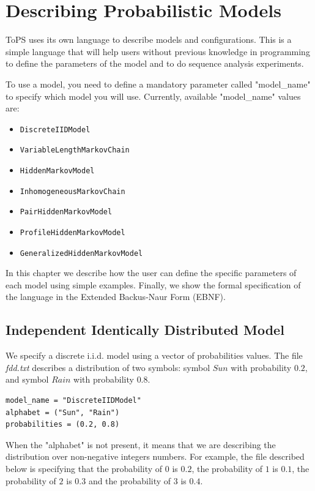 \chapter{Describing Probabilistic Models}


ToPS uses its own language to describe models and configurations. This is a simple language that will help users without previous knowledge in programming to define the parameters of the model and to do sequence analysis experiments.  

To use a model, you need to define a mandatory parameter called "model\_name" to specify which model you will use. Currently, available "model\_name"  values are:

\begin{itemize}
\item \texttt{DiscreteIIDModel} 
\item \texttt{VariableLengthMarkovChain} 
\item \texttt{HiddenMarkovModel}
\item \texttt{InhomogeneousMarkovChain}
\item \texttt{PairHiddenMarkovModel}
\item \texttt{ProfileHiddenMarkovModel} 
\item \texttt{GeneralizedHiddenMarkovModel}
\end{itemize}

In this chapter we describe how the user can define the specific parameters of each model using simple examples. Finally, we show the formal specification of the language in the Extended Backus-Naur Form (EBNF). 


\section{Independent Identically Distributed Model}

We specify a discrete i.i.d. model using a vector of probabilities values. The file \textit{fdd.txt} describes a distribution of two symbols: symbol $Sun$ with probability $0.2$, and symbol $Rain$ with probability $0.8$.

\begin{Verbatim}[frame=single,label=fdd.txt]
model_name = "DiscreteIIDModel"
alphabet = ("Sun", "Rain")
probabilities = (0.2, 0.8)
\end{Verbatim}


When the "alphabet" is not present, it means that we are describing the distribution over non-negative integers numbers. For example, the 
file described below is specifying that the probability of $0$ is $0.2$, the probability of $1$ is $0.1$, the probability of $2$ is $0.3$ and the probability of $3$ is $0.4$.

